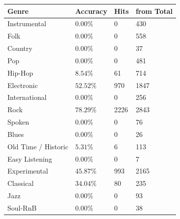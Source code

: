 \begin{center}
	\begin{tabular}{ p{} p{} p{} p{}}
		Genre & Accuracy & Hits & from Total\\
		\hline
		Instrumental & $0.00\%$ & 0 & 430\\
		Folk & $0.00\%$ & 0 & 558\\
		Country & $0.00\%$ & 0 & 37\\
		Pop & $0.00\%$ & 0 & 481\\
		Hip-Hop & $8.54\%$ & 61 & 714\\
		Electronic & $52.52\%$ & 970 & 1847\\
		International & $0.00\%$ & 0 & 256\\
		Rock & $78.29\%$ & 2226 & 2843\\
		Spoken & $0.00\%$ & 0 & 76\\
		Blues & $0.00\%$ & 0 & 26\\
		Old Time / Historic & $5.31\%$ & 6 & 113\\
		Easy Listening & $0.00\%$ & 0 & 7\\
		Experimental & $45.87\%$ & 993 & 2165\\
		Classical & $34.04\%$ & 80 & 235\\
		Jazz & $0.00\%$ & 0 & 93\\
		Soul-RnB & $0.00\%$ & 0 & 38\\
	\end{tabular}
		\label{tab:accperclass}
	\end{center}